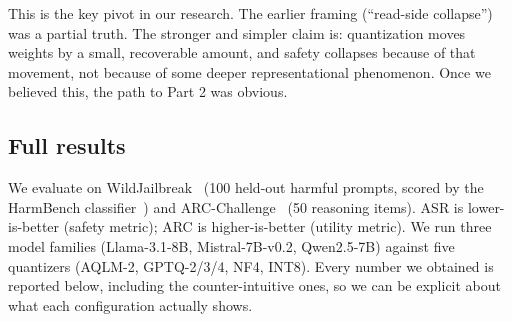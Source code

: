 \documentclass[11pt]{article}
\begin{document}
This is the key pivot in our research. The earlier framing (``read-side collapse'') was a partial truth. The stronger and simpler claim is: quantization moves weights by a small, recoverable amount, and safety collapses because of that movement, not because of some deeper representational phenomenon. Once we believed this, the path to Part 2 was obvious.

\subsection{Full results}

We evaluate on WildJailbreak~\cite{jiang2024wildjailbreak} (100 held-out harmful prompts, scored by the HarmBench classifier~\cite{mazeika2024harmbench}) and ARC-Challenge~\cite{clark2018arc} (50 reasoning items). ASR is lower-is-better (safety metric); ARC is higher-is-better (utility metric). We run three model families (Llama-3.1-8B, Mistral-7B-v0.2, Qwen2.5-7B) against five quantizers (AQLM-2, GPTQ-2/3/4, NF4, INT8). Every number we obtained is reported below, including the counter-intuitive ones, so we can be explicit about what each configuration actually shows.
\end{document}

